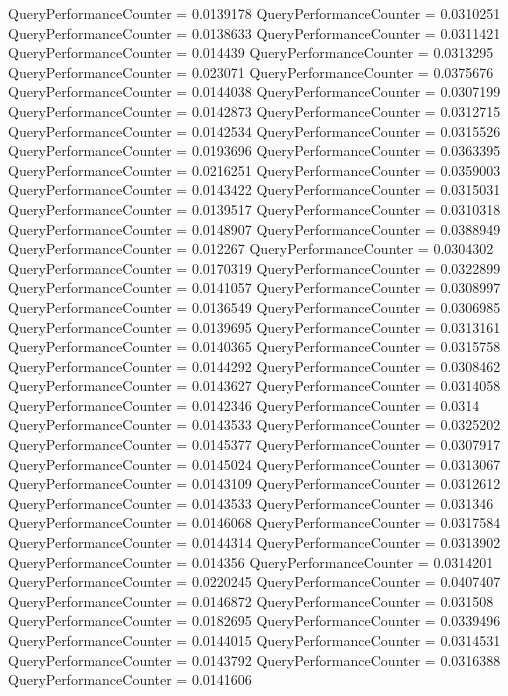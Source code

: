 \documentclass[9pt]{article}
\theoremstyle{plain}
\theoremstyle{definition}
\theoremstyle{remark}
\numberwithin{equation}{section}
\begin{document}
QueryPerformanceCounter  =  0.0139178
QueryPerformanceCounter  =  0.0310251
QueryPerformanceCounter  =  0.0138633
QueryPerformanceCounter  =  0.0311421
QueryPerformanceCounter  =  0.014439
QueryPerformanceCounter  =  0.0313295
QueryPerformanceCounter  =  0.023071
QueryPerformanceCounter  =  0.0375676
QueryPerformanceCounter  =  0.0144038
QueryPerformanceCounter  =  0.0307199
QueryPerformanceCounter  =  0.0142873
QueryPerformanceCounter  =  0.0312715
QueryPerformanceCounter  =  0.0142534
QueryPerformanceCounter  =  0.0315526
QueryPerformanceCounter  =  0.0193696
QueryPerformanceCounter  =  0.0363395
QueryPerformanceCounter  =  0.0216251
QueryPerformanceCounter  =  0.0359003
QueryPerformanceCounter  =  0.0143422
QueryPerformanceCounter  =  0.0315031
QueryPerformanceCounter  =  0.0139517
QueryPerformanceCounter  =  0.0310318
QueryPerformanceCounter  =  0.0148907
QueryPerformanceCounter  =  0.0388949
QueryPerformanceCounter  =  0.012267
QueryPerformanceCounter  =  0.0304302
QueryPerformanceCounter  =  0.0170319
QueryPerformanceCounter  =  0.0322899
QueryPerformanceCounter  =  0.0141057
QueryPerformanceCounter  =  0.0308997
QueryPerformanceCounter  =  0.0136549
QueryPerformanceCounter  =  0.0306985
QueryPerformanceCounter  =  0.0139695
QueryPerformanceCounter  =  0.0313161
QueryPerformanceCounter  =  0.0140365
QueryPerformanceCounter  =  0.0315758
QueryPerformanceCounter  =  0.0144292
QueryPerformanceCounter  =  0.0308462
QueryPerformanceCounter  =  0.0143627
QueryPerformanceCounter  =  0.0314058
QueryPerformanceCounter  =  0.0142346
QueryPerformanceCounter  =  0.0314
QueryPerformanceCounter  =  0.0143533
QueryPerformanceCounter  =  0.0325202
QueryPerformanceCounter  =  0.0145377
QueryPerformanceCounter  =  0.0307917
QueryPerformanceCounter  =  0.0145024
QueryPerformanceCounter  =  0.0313067
QueryPerformanceCounter  =  0.0143109
QueryPerformanceCounter  =  0.0312612
QueryPerformanceCounter  =  0.0143533
QueryPerformanceCounter  =  0.031346
QueryPerformanceCounter  =  0.0146068
QueryPerformanceCounter  =  0.0317584
QueryPerformanceCounter  =  0.0144314
QueryPerformanceCounter  =  0.0313902
QueryPerformanceCounter  =  0.014356
QueryPerformanceCounter  =  0.0314201
QueryPerformanceCounter  =  0.0220245
QueryPerformanceCounter  =  0.0407407
QueryPerformanceCounter  =  0.0146872
QueryPerformanceCounter  =  0.031508
QueryPerformanceCounter  =  0.0182695
QueryPerformanceCounter  =  0.0339496
QueryPerformanceCounter  =  0.0144015
QueryPerformanceCounter  =  0.0314531
QueryPerformanceCounter  =  0.0143792
QueryPerformanceCounter  =  0.0316388
QueryPerformanceCounter  =  0.0141606
\end{document}
